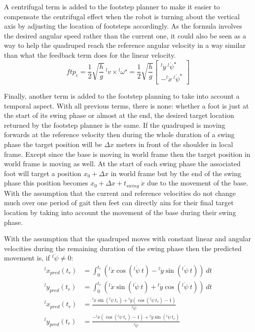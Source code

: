 \documentclass[a4paper,11pt]{article}
\begin{document}
A centrifugal term is added to the footstep planner to make it easier to compensate the centrifugal effect when the robot is turning about the vertical axis by adjusting the location of footsteps accordingly. As the formula involves the desired angular speed rather than the current one, it could also be seen as a way to help the quadruped reach the reference angular velocity in a way similar than what the feedback term does for the linear velocity.
\begin{equation}
{ftp}_{c} = \frac{1}{2} \sqrt{\frac{h}{g}} ~ {}^l\!v \times {}^l\!\omega^\star = \frac{1}{2} \sqrt{\frac{h}{g}} \begin{bmatrix} {}^l\!\dot y ~ {}^l\!\dot \psi^\star \\ - {}^l\!\dot x ~ {}^l\!\dot \psi^\star \end{bmatrix}
\end{equation}

Finally, another term is added to the footstep planning to take into account a temporal aspect. With all previous terms, there is none: whether a foot is just at the start of its swing phase or almost at the end, the desired target location returned by the footstep planner is the same. If the quadruped is moving forwards at the reference velocity then during the whole duration of a swing phase the target position will be $\Delta x$ meters in front of the shoulder in local frame. Except since the base is moving in world frame then the target position in world frame is moving as well. At the start of each swing phase the associated foot will target a position $x_0 + \Delta x$ in world frame but by the end of the swing phase this position becomes $x_0 + \Delta x + t_{swing} ~ \dot x$ due to the movement of the base. With the assumption that the current and reference velocities do not change much over one period of gait then feet can directly aim for their final target location by taking into account the movement of the base during their swing phase.

With the assumption that the quadruped moves with constant linear and angular velocities during the remaining duration of the swing phase then the predicted movement is, if ${}^l\!\dot \psi \neq 0$:
\begin{align}
{}^l\!x_{pred}(t_r) &= \int_{0}^{t_r} \left( {}^l\!\dot x \cos({}^l\!\dot \psi ~ t) - {}^l\!\dot y \sin({}^l\!\dot \psi ~ t) \right) ~dt \\
{}^l\!y_{pred}(t_r) &= \int_{0}^{t_r} \left( {}^l\!\dot x \sin({}^l\!\dot \psi ~ t) + {}^l\!\dot y \cos({}^l\!\dot \psi ~ t) \right) ~dt \\
{}^l\!x_{pred}(t_r) &= \frac{{}^l\!\dot x \sin({}^l\!\dot \psi ~ t_r) + {}^l\!\dot y \left( \cos({}^l\!\dot \psi ~ t_r) - 1 \right)}{{}^l\!\dot \psi} \\
{}^l\!y_{pred}(t_r) &= \frac{- {}^l\!\dot x \left( \cos({}^l\!\dot \psi ~ t_r) - 1 \right) + {}^l\!\dot y \sin({}^l\!\dot \psi ~ t_r)}{{}^l\!\dot \psi}
\end{align}
\end{document}
